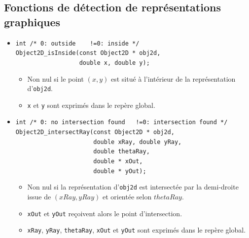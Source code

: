 \documentclass[12pt]{article}
\begin{document}
\subsection{Fonctions de d\'etection de repr\'esentations graphiques} 

\begin{itemize}
\item \verb|int /* 0: outside    !=0: inside */| \\
      \verb!Object2D_isInside(const Object2D * obj2d,! \\
      \verb!                  double x, double y);!
      \begin{itemize}
      \item Non nul si le point $(x,y)$ est situ\'e \`a l'int\'erieur de la
            repr\'esentation d'\verb!obj2d!.
      \item \verb!x! et \verb!y! sont exprim\'es dans le rep\`ere global.
      \end{itemize}
\item \verb|int /* 0: no intersection found   !=0: intersection found */| \\
      \verb!Object2D_intersectRay(const Object2D * obj2d,! \\
      \verb!                      double xRay, double yRay,!\\
      \verb!                      double thetaRay,!\\
      \verb!                      double * xOut,!\\
      \verb!                      double * yOut);!
      \begin{itemize}
      \item Non nul si la repr\'esentation d'\verb!obj2d! est intersect\'ee
            par la demi-droite issue de $(xRay,yRay)$ et orient\'ee selon
            $thetaRay$.
      \item \verb!xOut! et \verb!yOut! re\c coivent alors le point d'intersection.
      \item \verb!xRay!, \verb!yRay!, \verb!thetaRay!, \verb!xOut! et
            \verb!yOut! sont exprim\'es dans le rep\`ere global.
      \end{itemize}


\end{itemize}
\end{document}
